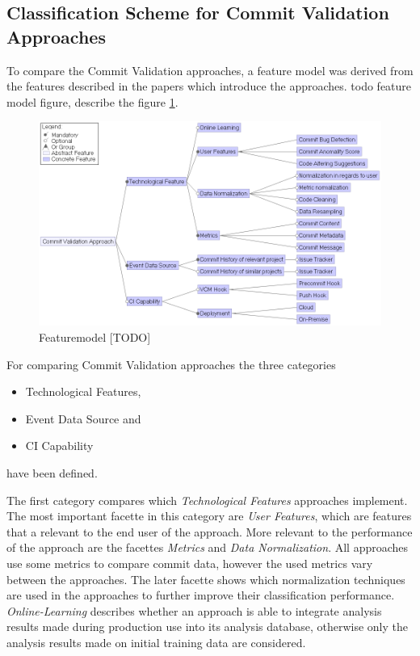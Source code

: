 \subsection{Classification Scheme for Commit Validation Approaches}
\label{sec:scheme}

To compare the Commit Validation approaches, a feature model was derived from the features described in the papers which introduce the approaches. 
todo feature model figure, describe the figure \ref{fig:featuremodel}.

\begin{figure}[h]
	\label{fig:featuremodel}
	\centering
	\includegraphics[width=15cm]{images/featuremodel}
	\caption{Featuremodel [TODO]}
\end{figure}

For comparing Commit Validation approaches the three categories
\begin{itemize}
	\item Technological Features, 
	\item Event Data Source and
	\item CI Capability
\end{itemize}
have been defined.

The first category compares which \textit{Technological Features} approaches implement. The most important facette in this category are \textit{User Features}, which are features that a relevant to the end user of the approach. 
More relevant to the performance of the approach are the facettes \textit{Metrics} and \textit{Data Normalization}. All approaches use some metrics to compare commit data, however the used metrics vary between the approaches.
The later facette shows which normalization techniques are used in the approaches to further improve their classification performance.
\textit{Online-Learning} describes whether an approach is able to integrate analysis results made during production use into its analysis database, otherwise only the analysis results made on initial training data are considered. 

